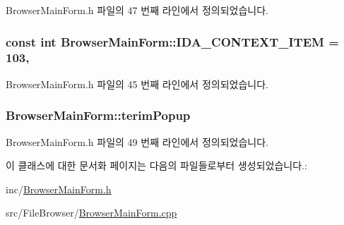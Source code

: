 Browser\+Main\+Form.\+h 파일의 47 번째 라인에서 정의되었습니다.

\hypertarget{class_browser_main_form_a0a7d8a0178a9034082799ab0aeeb28f0}{
\subsubsection[{I\+D\+A\+\_\+\+C\+O\+N\+T\+E\+X\+T\+\_\+\+I\+T\+E\+M}]{\setlength{\rightskip}{0pt plus 5cm}const int Browser\+Main\+Form\+::\+I\+D\+A\+\_\+\+C\+O\+N\+T\+E\+X\+T\+\_\+\+I\+T\+E\+M = 103\hspace{0.3cm}{\ttfamily [static]}, {\ttfamily [protected]}}}\label{class_browser_main_form_a0a7d8a0178a9034082799ab0aeeb28f0}


Browser\+Main\+Form.\+h 파일의 45 번째 라인에서 정의되었습니다.

\hypertarget{class_browser_main_form_a80aa3a53602f568da86d0f3931b5a06d}{
\subsubsection[{terim\+Popup}]{ Browser\+Main\+Form\+::terim\+Popup\hspace{0.3cm}{\ttfamily [protected]}}}\label{class_browser_main_form_a80aa3a53602f568da86d0f3931b5a06d}


Browser\+Main\+Form.\+h 파일의 49 번째 라인에서 정의되었습니다.



이 클래스에 대한 문서화 페이지는 다음의 파일들로부터 생성되었습니다.\+:\begin{DoxyCompactItemize}
\item 
inc/\hyperlink{_browser_main_form_8h}{Browser\+Main\+Form.\+h}\item 
src/\+File\+Browser/\hyperlink{_browser_main_form_8cpp}{Browser\+Main\+Form.\+cpp}\end{DoxyCompactItemize}
